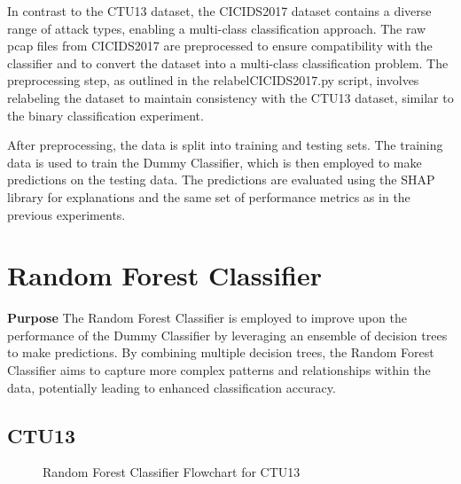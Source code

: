 In contrast to the CTU13 dataset, the CICIDS2017 dataset contains a diverse range of attack types, enabling a multi-class classification approach. The raw pcap files from CICIDS2017 are preprocessed to ensure compatibility with the classifier and to convert the dataset into a multi-class classification problem. The preprocessing step, as outlined in the relabelCICIDS2017.py script, involves relabeling the dataset to maintain consistency with the CTU13 dataset, similar to the binary classification experiment.

After preprocessing, the data is split into training and testing sets. The training data is used to train the Dummy Classifier, which is then employed to make predictions on the testing data. The predictions are evaluated using the SHAP library for explanations and the same set of performance metrics as in the previous experiments.

\section{Random Forest Classifier}\label{sec:RandomForestClassifier}
\textbf{Purpose} The Random Forest Classifier is employed to improve upon the performance of the Dummy Classifier by leveraging an ensemble of decision trees to make predictions. By combining multiple decision trees, the Random Forest Classifier aims to capture more complex patterns and relationships within the data, potentially leading to enhanced classification accuracy.

\subsection{CTU13}
\begin{figure}[H]
\centering
{}
\caption{Random Forest Classifier Flowchart for CTU13}\label{fig:RandomForestFlowCTU13}
\end{figure}

